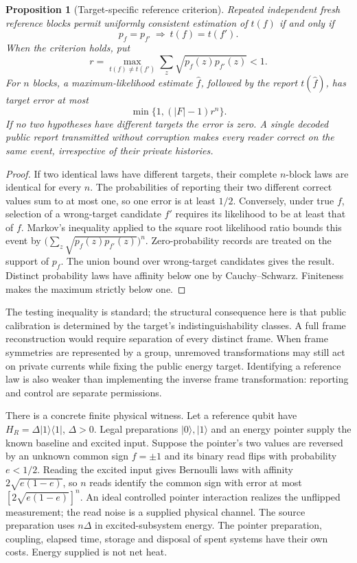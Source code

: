 \documentclass[12pt]{article}
\newtheorem{proposition}[theorem]{Proposition}
\theoremstyle{definition}
\theoremstyle{remark}
\begin{document}
\begin{proposition}[Target-specific reference criterion]
\label{prop:targetcalibration}
Repeated independent fresh reference blocks permit uniformly consistent
estimation of \(t(f)\) if and only if
\[
 p_f=p_{f'}\ \Longrightarrow\ t(f)=t(f').
\]
When the criterion holds, put
\[
 r=\max_{t(f)\ne t(f')}
       \sum_z\sqrt{p_f(z)p_{f'}(z)}<1.
\]
For \(n\) blocks, a maximum-likelihood estimate \(\hat f\), followed
by the report \(t(\hat f)\), has target error at most
\[
 \min\{1,(|F|-1)r^n\}.
\]
If no two hypotheses have different targets the error is zero. A single
decoded public report transmitted without corruption makes every reader
correct on the same event, irrespective of their private histories.
\end{proposition}
\begin{proof}
If two identical laws have different targets, their complete \(n\)-block
laws are identical for every \(n\). The probabilities of reporting their
two different correct values sum to at most one, so one error is at least
\(1/2\). Conversely, under true \(f\), selection of a wrong-target
candidate \(f'\) requires its likelihood to be at least that of \(f\).
Markov's inequality applied to the square root likelihood ratio bounds
this event by
\(\bigl(\sum_z\sqrt{p_f(z)p_{f'}(z)}\bigr)^n\).
Zero-probability records are treated on the support of \(p_f\).
The union bound over wrong-target candidates gives the result.
Distinct probability laws have affinity below one by Cauchy--Schwarz.
Finiteness makes the maximum strictly below one.
\end{proof}

The testing inequality is standard; the structural consequence here is
that public calibration is determined by the target's indistinguishability
classes. A full frame reconstruction would require separation of every
distinct frame. When frame symmetries are represented by a group,
unremoved transformations may still act on private currents while fixing
the public energy target. Identifying a reference law is also weaker than
implementing the inverse frame transformation: reporting and control are
separate permissions.

There is a concrete finite physical witness. Let a reference qubit have
\(H_R=\Delta|1\rangle\langle1|\), \(\Delta>0\). Legal preparations
\(|0\rangle,|1\rangle\) and an energy pointer supply the known baseline
and excited input. Suppose the pointer's two values are reversed by an
unknown common sign \(f=\pm1\) and its binary read flips with probability
\(e<1/2\). Reading the excited input gives Bernoulli laws with
affinity \(2\sqrt{e(1-e)}\), so \(n\) reads identify the common sign
with error at most \([2\sqrt{e(1-e)}]^n\).
An ideal controlled pointer interaction realizes the unflipped
measurement; the read noise is a supplied physical channel.
The source preparation uses \(n\Delta\) in excited-subsystem energy.
The pointer preparation, coupling, elapsed time, storage and disposal of
spent systems have their own costs. Energy supplied is not net heat.
\end{document}
